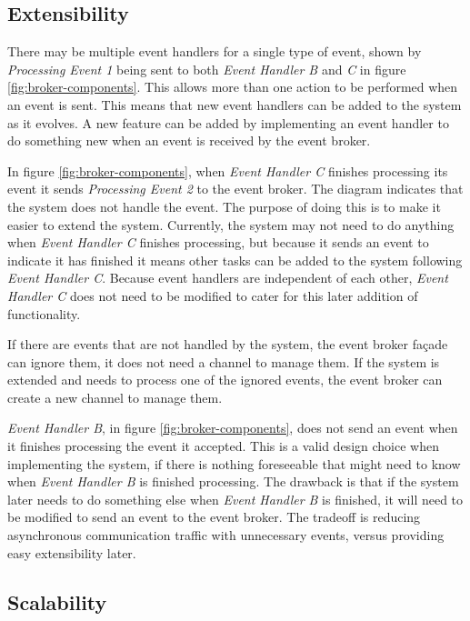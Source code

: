 \subsection{Extensibility}\label{sec:extensibility}

There may be multiple event handlers for a single type of event,
shown by \emph{Processing Event 1} being sent to both \emph{Event Handler B} and \emph{C} in figure \ref{fig:broker-components}.
This allows more than one action to be performed when an event is sent.
This means that new event handlers can be added to the system as it evolves.
A new feature can be added by implementing an event handler to do something new when an event is received by the event broker.

In figure \ref{fig:broker-components}, when \emph{Event Handler C} finishes processing its event it sends \emph{Processing Event 2} to the event broker.
The diagram indicates that the system does not handle the event.
The purpose of doing this is to make it easier to extend the system.
Currently, the system may not need to do anything when \emph{Event Handler C} finishes processing,
but because it sends an event to indicate it has finished it means other tasks can be added to the system following \emph{Event Handler C}.
Because event handlers are independent of each other, \emph{Event Handler C} does not need to be modified to cater for this later addition of functionality.

If there are events that are not handled by the system, the event broker façade can ignore them, it does not need a channel to manage them.
If the system is extended and needs to process one of the ignored events, the event broker can create a new channel to manage them.

\emph{Event Handler B}, in figure \ref{fig:broker-components}, does not send an event when it finishes processing the event it accepted.
This is a valid design choice when implementing the system,
if there is nothing foreseeable that might need to know when \emph{Event Handler B} is finished processing.
The drawback is that if the system later needs to do something else when \emph{Event Handler B} is finished,
it will need to be modified to send an event to the event broker.
The tradeoff is reducing asynchronous communication traffic with unnecessary events, versus providing easy extensibility later.

\subsection{Scalability}

